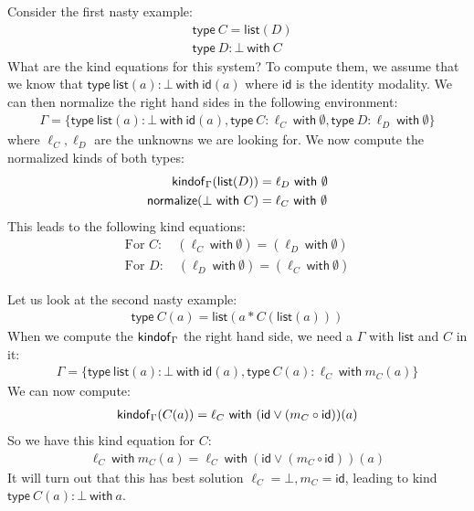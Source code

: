 \documentclass{article}
\newcommand{\type}{\mathsf{type\ }}
\newcommand{\with}{\mathsf{\ with\ }}
\newcommand{\id}{\mathsf{id}}
\newcommand{\normalize}{\mathsf{normalize}}
\begin{document}
Consider the first nasty example:
\begin{align*}
    &\mathsf{type\ } C = \mathsf{list}(D)\\
    &\mathsf{type\ } D : \bot \mathsf{\ with\ } C
\end{align*}
What are the kind equations for this system?
To compute them, we assume that we know that $\type \mathsf{list}(a) : \bot \with \id(a)$ where $\id$ is the identity modality.
We can then normalize the right hand sides in the following environment:
\begin{align*}
    \Gamma = \{ \type \mathsf{list}(a) : \bot \with \id(a), \type C : \ell_C \with \emptyset, \type D : \ell_D \with \emptyset\}
\end{align*}
where $\ell_C,\ell_D$ are the unknowns we are looking for.
We now compute the normalized kinds of both types:
\begin{align}
    \kindof(\mathsf{list}(D)) &= \ell_D \with \emptyset\\
    \normalize(\bot \with C) &= \ell_C \with \emptyset
\end{align}
This leads to the following kind equations:
\begin{align*}
    \text{For } C\!:\quad (\ell_C \with \emptyset) = (\ell_D \with \emptyset)\\
    \text{For } D\!:\quad (\ell_D \with \emptyset) = (\ell_C \with \emptyset)
\end{align*}

Let us look at the second nasty example:
\begin{align*}
    \mathsf{type\ } C(a) = \mathsf{list}(a \ast C(\mathsf{list}(a)))
\end{align*}
When we compute the $\mathsf{kindof}_\Gamma$ the right hand side, we need a $\Gamma$ with $\mathsf{list}$ and $C$ in it:
\begin{align}
    \Gamma = \{ \type \mathsf{list}(a) : \bot \with \id(a), \type C(a) : \ell_C \with m_C(a) \}
\end{align}
We can now compute:
\begin{align*}
    \kindof(C(a)) = \ell_C \with (\id \vee (m_C \circ \id))(a)
\end{align*}
So we have this kind equation for $C$:
\begin{align*}
    \ell_C \with m_C(a) = \ell_C \with (\id \vee (m_C \circ \id))(a)
\end{align*}
It will turn out that this has best solution $\ell_C = \bot, m_C = \id$, leading to kind $\type C(a) : \bot \with a$.
\end{document}
